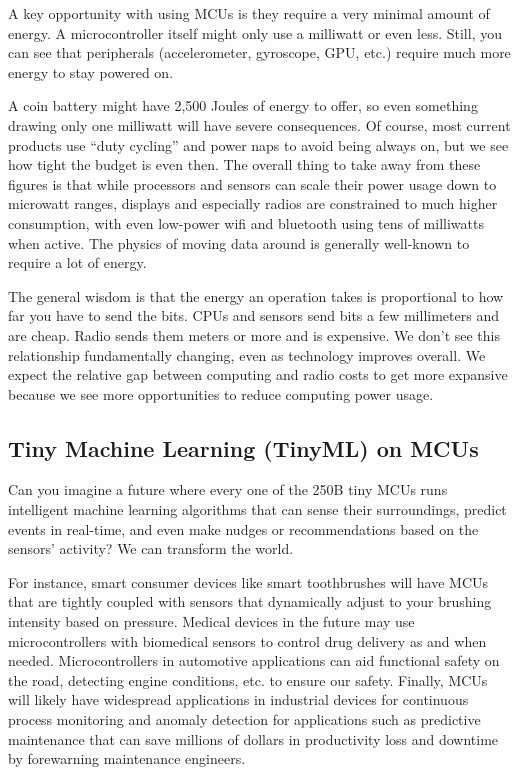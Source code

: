 A key opportunity with using MCUs is they require a very minimal amount of energy. A microcontroller itself might only use a milliwatt or even less. Still, you can see that peripherals (accelerometer, gyroscope, GPU, etc.) require much more energy to stay powered on.

A coin battery might have 2,500 Joules of energy to offer, so even something drawing only one milliwatt will have severe consequences. Of course, most current products use “duty cycling” and power naps to avoid being always on, but we see how tight the budget is even then. The overall thing to take away from these figures is that while processors and sensors can scale their power usage down to microwatt ranges, displays and especially radios are constrained to much higher consumption, with even low-power wifi and bluetooth using tens of milliwatts when active. The physics of moving data around is generally well-known to require a lot of energy.

The general wisdom is that the energy an operation takes is proportional to how far you have to send the bits. CPUs and sensors send bits a few millimeters and are cheap. Radio sends them meters or more and is expensive. We don’t see this relationship fundamentally changing, even as technology improves overall. We expect the relative gap between computing and radio costs to get more expansive because we see more opportunities to reduce computing power usage.

\subsection{Tiny Machine Learning (TinyML) on MCUs}

Can you imagine a future where every one of the 250B tiny MCUs runs intelligent machine learning algorithms that can sense their surroundings, predict events in real-time, and even make nudges or recommendations based on the sensors' activity? We can transform the world.

For instance, smart consumer devices like smart toothbrushes will have MCUs that are tightly coupled with sensors that dynamically adjust to your brushing intensity based on pressure. Medical devices in the future may use microcontrollers with biomedical sensors to control drug delivery as and when needed. Microcontrollers in automotive applications can aid functional safety on the road, detecting engine conditions, etc. to ensure our safety. Finally, MCUs will likely have widespread applications in industrial devices for continuous process monitoring and anomaly detection for applications such as predictive maintenance that can save millions of dollars in productivity loss and downtime by forewarning maintenance engineers.

